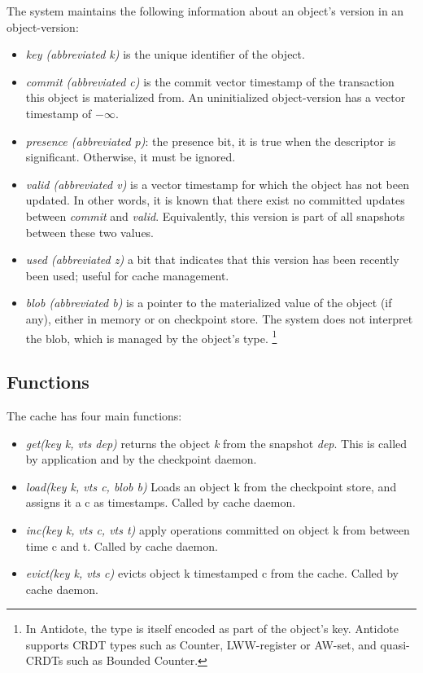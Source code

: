 \documentclass[twoside]{article}
\begin{document}
The system maintains the following information about an object's version
in an object-version:
\begin{itemize}
\item
  \emph{key (abbreviated k)} is the unique identifier of the object.
\item
  \emph{commit (abbreviated c)} is the commit vector timestamp of the transaction
  this object is materialized from.
  An uninitialized object-version has a vector timestamp of $-\infty$.
\item
\emph{presence (abbreviated p)}: the presence bit, it is true when the descriptor is
significant. 
Otherwise, it must be ignored.
\item
  \emph{valid (abbreviated v)} is a vector timestamp for which the object has
  not been updated.
  In other words, it is known that there exist no committed
  updates between \emph{commit} and \emph{valid}.
  Equivalently, this version is part of all snapshots between these two
  values.
\item
  \emph{used (abbreviated z)} a bit that indicates that this version has been recently been
  used; useful for cache management.
\item
  \emph{blob (abbreviated b)} is a pointer to the materialized value of the object (if
  any), either in memory or on checkpoint store.
  The system does not interpret the blob, which is managed by the
  object's type.%
  \footnote{
    In Antidote, the type is itself encoded as part of the object's key.
    Antidote supports CRDT types such as Counter, LWW-register or
    AW-set, and quasi-CRDTs such as Bounded Counter.
  }
\end{itemize}


\subsection{Functions}
The cache has four main functions:
\begin{itemize}
  \item \emph{get(key k, vts dep)} returns the object \emph{k} from the snapshot 
  \emph{dep}. This is called by application and by the checkpoint daemon.
  \item \emph{load(key k, vts c, blob b)} Loads an object k from the checkpoint
  store, and assigns it a c as timestamps. Called by cache daemon.
  \item \emph{inc(key k, vts c, vts t)} apply operations committed on object k from
  between time c and t. Called by cache daemon.
  \item \emph{evict(key k, vts c)} evicts object k timestamped c from the cache. 
  Called by cache daemon.
\end{itemize}
\end{document}
